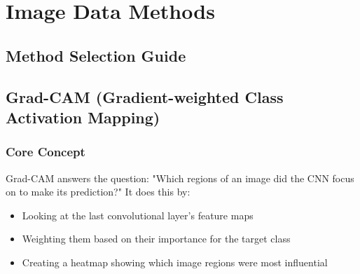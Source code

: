\documentclass{article}
\begin{document}
\pagebreak
\section{Image Data Methods}

\subsection{Method Selection Guide}
\begin{table}[h]
\caption{Comparison of Image XAI Methods}
\begin{center}
\end{center}
\end{table}

\subsection{Grad-CAM (Gradient-weighted Class Activation Mapping)}

\subsubsection{Core Concept}
Grad-CAM answers the question: "Which regions of an image did the CNN focus on to make its prediction?" It does this by:
\begin{itemize}
    \item Looking at the last convolutional layer's feature maps
    \item Weighting them based on their importance for the target class
    \item Creating a heatmap showing which image regions were most influential
\end{itemize}
\end{document}
